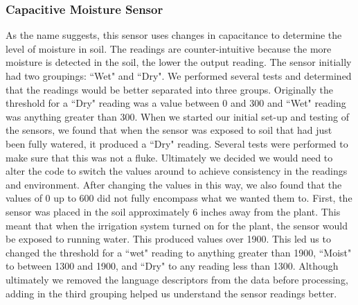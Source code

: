 \subsubsection{Capacitive Moisture Sensor}
As the name suggests, this sensor uses changes in capacitance to determine the level of moisture in soil. The readings are counter-intuitive because the more moisture is detected in the soil, the lower the output reading. The sensor initially had two groupings: ``Wet" and ``Dry". We performed several tests and determined that the readings would be better separated into three groups. Originally the threshold for a ``Dry" reading was a value between 0 and 300 and ``Wet" reading was anything greater than 300. When we started our initial set-up and testing of the sensors, we found that when the sensor was exposed to soil that had just been fully watered, it produced a ``Dry" reading. Several tests were performed to make sure that this was not a fluke. Ultimately we decided we would need to alter the code to switch the values around to achieve consistency in the readings and environment. After changing the values in this way, we also found that the values of 0 up to 600 did not fully encompass what we wanted them to. First, the sensor was placed in the soil approximately 6 inches away from the plant. This meant that when the irrigation system turned on for the plant, the sensor would be exposed to running water. This produced values over 1900. This led us to changed the threshold for a ``wet" reading to anything greater than 1900, ``Moist" to between 1300 and 1900, and ``Dry" to any reading less than 1300. Although ultimately we removed the language descriptors from the data before processing, adding in the third grouping helped us understand the sensor readings better.

